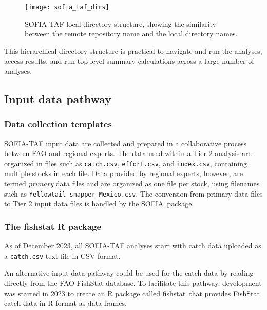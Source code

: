 \documentclass[12pt]{article}
\newcommand\fishstat{{\sf fishstat}}
\newcommand\SOFIA{{\sf SOFIA}}
\begin{document}
\begin{figure}[htb]
  \begin{center}
    \texttt{[image: sofia\_taf\_dirs]}
    \vspace{1ex}
    \caption{SOFIA-TAF local directory structure, showing the similarity between
      the remote repository name and the local directory names.}
    \label{fig:sofia-taf-dirs}
  \end{center}
\end{figure}

\vspace{1ex}

This hierarchical directory structure is practical to navigate and run the
analyses, access results, and run top-level summary calculations across a large
number of analyses.

\subsection{Input data pathway}

\subsubsection{Data collection templates}

SOFIA-TAF input data are collected and prepared in a collaborative process
between FAO and regional experts. The data used within a Tier 2 analysis are
organized in files such as \verb|catch.csv|, \verb|effort.csv|, and
\verb|index.csv|, containing multiple stocks in each file. Data provided by
regional experts, however, are termed {\it primary} data files and are organized
as one file per stock, using filenames such as
\verb|Yellowtail_snapper_Mexico.csv|. The conversion from primary data files to
Tier 2 input data files is handled by the \SOFIA\ package.

\subsubsection{The fishstat R package}

As of December 2023, all SOFIA-TAF analyses start with catch data uploaded as
a \verb|catch.csv| text file in CSV format.

An alternative input data pathway could be used for the catch data by reading
directly from the FAO FishStat database. To facilitate this pathway, development
was started in 2023 to create an R package called \fishstat\ that provides
FishStat catch data in R format as data frames.
\end{document}
